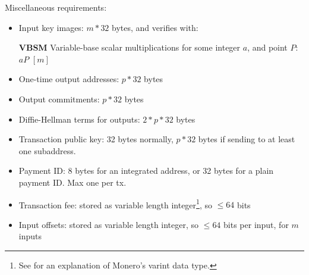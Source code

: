 Miscellaneous requirements:
\begin{itemize}
    \setlength\itemsep{\listspace}
    \item Input key images: $m*32$ bytes, and verifies with:
    \item [\textbf{VBSM}] Variable-base scalar multiplications for some integer $a$, and point $P$: $a P$ \quad \([m]\)
    \item One-time output addresses: $p*32$ bytes
    \item Output commitments: $p*32$ bytes
    \item Diffie-Hellman terms for outputs: $2*p*32$ bytes
    \item Transaction public key: 32 bytes normally, $p*32$ bytes if sending to at least one subaddress.
    \item Payment ID: 8 bytes for an integrated address, or 32 bytes for a plain payment ID. Max one per tx.
    \item Transaction fee: stored as variable length integer\footnote{See \cite{varint-description} for an explanation of Monero's varint data type.}, so $\leq 64$ bits
    \item Input offsets: stored as variable length integer, so $\leq 64$ bits per input, for $m$ inputs
\end{itemize}